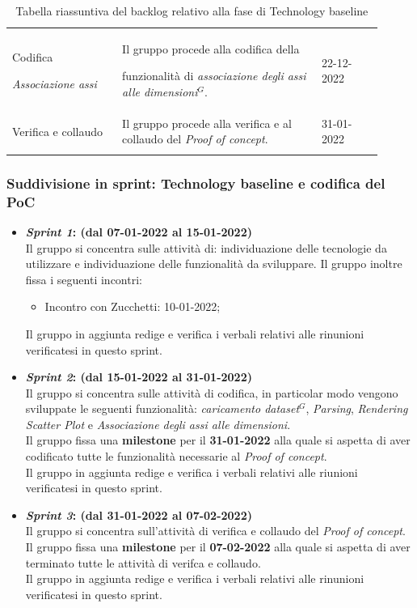 {\begin{longtable}{p{0.27\linewidth}p{0.49\linewidth}p{0.15\linewidth}}
    \rowcolor[RGB]{216, 235, 171}
    Codifica \par \textit{Associazione assi} & Il gruppo procede alla codifica della \par funzionalità di \textit{associazione degli assi alle dimensioni$^{G}$}. & 22-12-2022\\

    \rowcolor[RGB]{233, 245, 206}
    Verifica e collaudo & Il gruppo procede alla verifica e al collaudo del \textit{Proof of concept}. & 31-01-2022\\

    \caption{Tabella riassuntiva del backlog relativo alla fase di Technology baseline}
\end{longtable}	
}

\subsubsection{Suddivisione in sprint: Technology baseline e codifica del PoC}
\begin{itemize}
    \item \textbf{\textit{Sprint 1}: (dal 07-01-2022 al 15-01-2022)}\\
    Il gruppo si concentra sulle attività di: individuazione delle tecnologie da utilizzare e individuazione delle funzionalità da sviluppare.
    Il gruppo inoltre fissa i seguenti incontri:
    \begin{itemize}
        \item Incontro con Zucchetti: 10-01-2022;
    \end{itemize}
    Il gruppo in aggiunta redige e verifica i verbali relativi alle rinunioni verificatesi in questo sprint.

    \item \textbf{\textit{Sprint 2}: (dal 15-01-2022 al 31-01-2022)}\\
    Il gruppo si concentra sulle attività di codifica, in particolar modo vengono sviluppate le seguenti funzionalità: \textit{caricamento dataset$^{G}$}, \textit{Parsing}, \textit{Rendering Scatter Plot} e \textit{Associazione degli assi alle dimensioni}.\\
    Il gruppo fissa una \textbf{milestone} per il \textbf{31-01-2022} alla quale si aspetta di aver codificato tutte le funzionalità necessarie al \textit{Proof of concept}.\\
    Il gruppo in aggiunta redige e verifica i verbali relativi alle riunioni verificatesi in questo sprint.

    \item \textbf{\textit{Sprint 3}: (dal 31-01-2022 al 07-02-2022)}\\
    Il gruppo si concentra sull'attività di verifica e collaudo del \textit{Proof of concept}.\\
    Il gruppo fissa una \textbf{milestone} per il \textbf{07-02-2022} alla quale si aspetta di aver terminato tutte le attività di verifca e collaudo.\\
    Il gruppo in aggiunta redige e verifica i verbali relativi alle rinunioni verificatesi in questo sprint.
\end{itemize}

